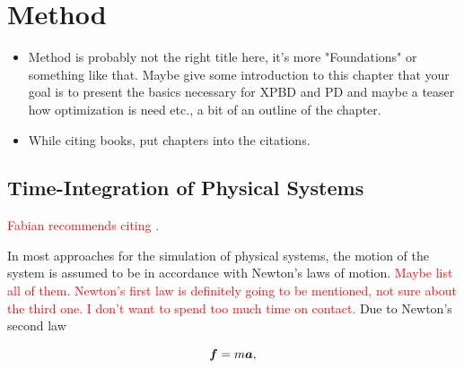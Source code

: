 \chapter{Method}\label{ch:method}

\begin{itemize}
    \item Method is probably not the right title here, it's more "Foundations" or something like that.
        Maybe give some introduction to this chapter that your goal is to present the basics necessary for XPBD and 
        PD and maybe a teaser how optimization is need etc., a bit of an outline of the chapter.
    \item While citing books, put chapters into the citations.
\end{itemize}

\section{Time-Integration of Physical Systems}\label{s:physical-integration}
\textcolor{red}{Fabian recommends citing \cite{gast2015}.}

In most approaches for the simulation of physical systems, the motion of the system is assumed to be in accordance with Newton's laws of
motion. \textcolor{red}{Maybe list all of them. Newton's first law is definitely going to be mentioned, not sure about the third one. I
don't want to spend too much time on contact.} Due to Newton's second law 

\begin{equation}\label{newtons-laws-2}
    \bm{f} = m\bm{a},
\end{equation}

